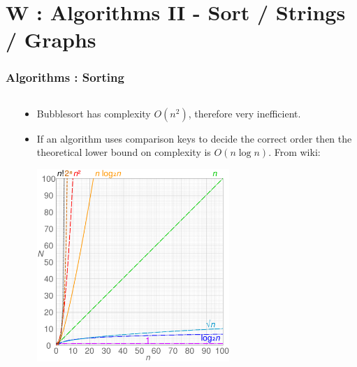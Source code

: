 \section{W : Algorithms II - Sort / Strings / Graphs}
\label{chap:algos2}


\begin{frame}[fragile]
\frametitle{Algorithms : Sorting}
\begin{columns}[T]

\begin{column}{0.45\textwidth}

\end{column}

\pause
\begin{column}{0.45\textwidth}
\begin{itemize}[<+->]
\item Bubblesort has complexity $O(n^2)$, therefore very inefficient.
\item If an algorithm uses comparison keys to decide the correct order
then the theoretical lower bound on complexity is $O(n \log n )$. From wiki:
\pause
\begin{center}
\includegraphics[width=0.6\textwidth]{../Images/1280px-Comparison_computational_complexity.png}
\end{center}
\end{itemize}
\end{column}

\end{columns}
\end{frame}


